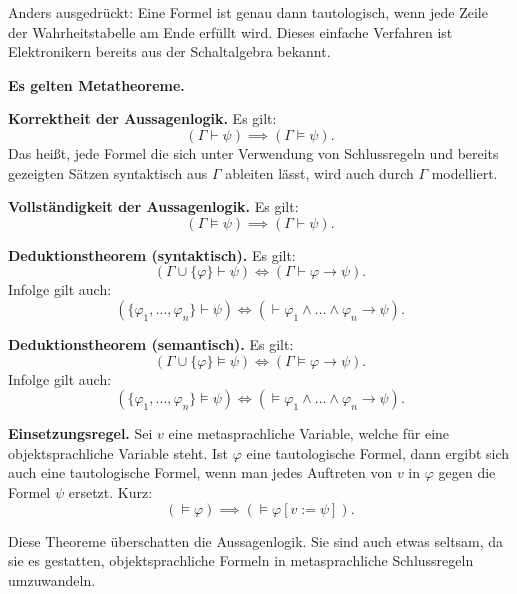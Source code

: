 \documentclass{beamer}
\newcommand{\strong}[1]{\textsf{\textbf{#1}}}
\begin{document}
\begin{frame}
Anders ausgedrückt: Eine Formel ist genau dann tautologisch,
wenn jede Zeile der Wahrheitstabelle am Ende erfüllt wird.
Dieses einfache Verfahren ist Elektronikern bereits aus der
Schaltalgebra bekannt.
\end{frame}

\begin{frame}
\strong{Es gelten Metatheoreme.}
\end{frame}

\begin{frame}
\strong{Korrektheit der Aussagenlogik.}
Es gilt:
\[(\Gamma\vdash\psi)\implies (\Gamma\models\psi).\]
Das heißt, jede Formel die sich unter Verwendung von
Schlussregeln und bereits gezeigten Sätzen syntaktisch aus $\Gamma$
ableiten lässt, wird auch durch $\Gamma$ modelliert.
\end{frame}

\begin{frame}
\strong{Vollständigkeit der Aussagenlogik.}
Es gilt:
\[(\Gamma\models\psi)\implies (\Gamma\vdash\psi).\]
\end{frame}

\begin{frame}
\strong{Deduktionstheorem (syntaktisch).}
Es gilt:
\[(\Gamma\cup\{\varphi\}\vdash\psi)
\iff(\Gamma\vdash\varphi\rightarrow\psi).\]
Infolge gilt auch:
\[(\{\varphi_1,\ldots,\varphi_n\}\vdash\psi)
\iff (\vdash\varphi_1\land\ldots\land\varphi_n\rightarrow\psi).\]
\end{frame}

\begin{frame}
\strong{Deduktionstheorem (semantisch).}
Es gilt:
\[(\Gamma\cup\{\varphi\}\models\psi)
\iff(\Gamma\models\varphi\rightarrow\psi).\]
Infolge gilt auch:
\[(\{\varphi_1,\ldots,\varphi_n\}\models\psi)
\iff (\models\varphi_1\land\ldots\land\varphi_n\rightarrow\psi).\]
\end{frame}

\begin{frame}
\strong{Einsetzungsregel.} Sei $v$ eine metasprachliche Variable,
welche für eine objektsprachliche Variable steht. Ist $\varphi$
eine tautologische Formel, dann ergibt sich auch eine tautologische
Formel, wenn man jedes Auftreten von $v$ in $\varphi$ gegen die
Formel $\psi$ ersetzt. Kurz:
\[(\models\varphi)\implies (\models\varphi[v:=\psi]).\]
\end{frame}

\begin{frame}
Diese Theoreme überschatten die Aussagenlogik. Sie sind auch etwas
seltsam, da sie es gestatten, objektsprachliche Formeln in
metasprachliche Schlussregeln umzuwandeln.
\end{frame}
\end{document}

